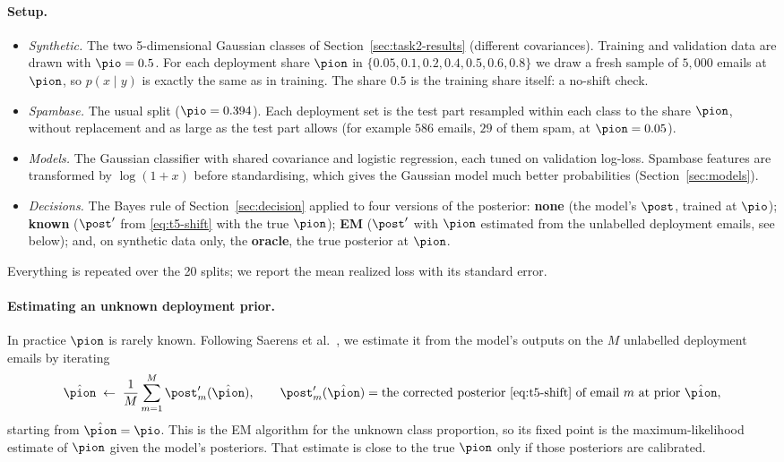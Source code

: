 \paragraph{Setup.}
\begin{itemize}[itemsep=1pt,topsep=2pt]
  \item \emph{Synthetic.} The two 5-dimensional Gaussian classes of Section~\ref{sec:task2-results}
        (different covariances). Training and validation data are drawn with $\pio=0.5$. For each
        deployment share $\pion$ in $\{0.05,\allowbreak 0.1,\allowbreak 0.2,\allowbreak 0.4,\allowbreak 0.5,\allowbreak
        0.6,\allowbreak 0.8\}$ we draw a fresh sample of $5{,}000$ emails at $\pion$, so $p(x\mid y)$ is exactly the
        same as in training. The share $0.5$ is the training share itself: a no-shift check.
  \item \emph{Spambase.} The usual split ($\pio=0.394$). Each deployment set is the test part resampled
        within each class to the share $\pion$, without replacement and as large as the test part allows
        (for example $586$ emails, $29$ of them spam, at $\pion=0.05$).
  \item \emph{Models.} The Gaussian classifier with shared covariance and logistic regression, each tuned on
        validation log-loss. Spambase features are transformed by $\log(1+x)$ before standardising, which gives
        the Gaussian model much better probabilities (Section~\ref{sec:models}).
  \item \emph{Decisions.} The Bayes rule of Section~\ref{sec:decision} applied to four versions of the posterior:
        \textbf{none} (the model's $\post$, trained at $\pio$);
        \textbf{known} ($\post'$ from \eqref{eq:t5-shift} with the true $\pion$);
        \textbf{EM} ($\post'$ with $\pion$ estimated from the unlabelled deployment emails, see below);
        and, on synthetic data only, the \textbf{oracle}, the true posterior at $\pion$.
\end{itemize}
Everything is repeated over the 20 splits; we report the mean realized loss with its standard error.

\paragraph{Estimating an unknown deployment prior.}
In practice $\pion$ is rarely known. Following Saerens et al.~\cite{saerens2002}, we estimate it from the
model's outputs on the $M$ unlabelled deployment emails by iterating
\[
  \hat{\pion} \;\leftarrow\; \frac1M\sum_{m=1}^M \post'_m(\hat{\pion}),
  \qquad \post'_m(\hat{\pion}) = \text{the corrected posterior \eqref{eq:t5-shift} of email $m$ at prior }\hat{\pion},
\]
starting from $\hat{\pion}=\pio$. This is the EM algorithm for the unknown class proportion, so its fixed point is
the maximum-likelihood estimate of $\pion$ given the model's posteriors. That estimate is close to the true
$\pion$ only if those posteriors are calibrated.

